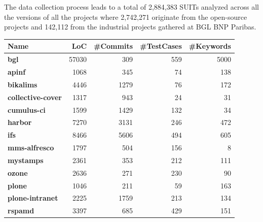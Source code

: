 The data collection process leads to a total of 2,884,383 SUITs analyzed across all the versions of all the projects where 2,742,271 originate from the open-source projects and 142,112 from the industrial projects gathered at BGL BNP Paribas.

\begin{table}
\centering

\begin{tabularx}{\textwidth}{LRRRR}

\hline
\textbf{Name} & \textbf{LoC} & \textbf{\#Commits} & \textbf{\#TestCases} & \textbf{\#Keywords} \\
\hline

\scriptsize{\textbf{bgl}} & \scriptsize{57030} & \scriptsize{309} & \scriptsize{559} & \scriptsize{5000} \\

\hline

\scriptsize{\textbf{apinf}} & \scriptsize{1068} & \scriptsize{345} & \scriptsize{74} & \scriptsize{138} \\
\scriptsize{\textbf{bikalims}} & \scriptsize{4446} & \scriptsize{1279} & \scriptsize{76} & \scriptsize{172} \\
\scriptsize{\textbf{collective-cover}} & \scriptsize{1317} & \scriptsize{943} & \scriptsize{24} & \scriptsize{31} \\
\scriptsize{\textbf{cumulus-ci}} & \scriptsize{1599} & \scriptsize{1429} & \scriptsize{132} & \scriptsize{34} \\
\scriptsize{\textbf{harbor}} & \scriptsize{7270} & \scriptsize{3131} & \scriptsize{246} & \scriptsize{472} \\
\scriptsize{\textbf{ifs}} & \scriptsize{8466} & \scriptsize{5606} & \scriptsize{494} & \scriptsize{605} \\
\scriptsize{\textbf{mms-alfresco}} & \scriptsize{1797} & \scriptsize{504} & \scriptsize{156} & \scriptsize{8} \\
\scriptsize{\textbf{mystamps}} & \scriptsize{2361} & \scriptsize{353} & \scriptsize{212} & \scriptsize{111} \\
\scriptsize{\textbf{ozone}} & \scriptsize{2636} & \scriptsize{271} & \scriptsize{230} & \scriptsize{90} \\
\scriptsize{\textbf{plone}} & \scriptsize{1046} & \scriptsize{211} & \scriptsize{59} & \scriptsize{163} \\
\scriptsize{\textbf{plone-intranet}} & \scriptsize{2225} & \scriptsize{1759} & \scriptsize{213} & \scriptsize{134} \\
\scriptsize{\textbf{rspamd}} & \scriptsize{3397} & \scriptsize{685} & \scriptsize{429} & \scriptsize{151} \\


\end{tabularx}
\end{table}
